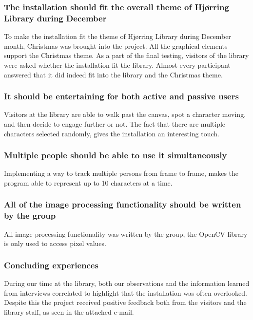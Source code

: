 \subsubsection{The installation should fit the overall theme of Hj{\o}rring Library during December}
To make the installation fit the theme of Hj{\o}rring Library during December month, Christmas was brought into the project. All the graphical elements support the Christmas theme. As a part of the final testing, visitors of the library were asked whether the installation fit the library. Almost every participant answered that it did indeed fit into the library and the Christmas theme.


\subsubsection{It should be entertaining for both active and passive users}
Visitors at the library are able to walk past the canvas, spot a character moving, and then decide to engage further or not. The fact that there are multiple characters selected randomly, gives the installation an interesting touch.

\subsubsection{Multiple people should be able to use it simultaneously}
Implementing a way to track multiple persons from frame to frame, makes the program able to represent up to 10 characters at a time.

\subsubsection{All of the image processing functionality should be written by the group}
All image processing functionality was written by the group, the OpenCV library is only used to access pixel values. 

\subsubsection{Concluding experiences}
During our time at the library, both our observations and the information learned from interviews correlated to highlight that the installation was often overlooked. Despite this the project received positive feedback both from the visitors and the library staff, as seen in the attached e-mail.


